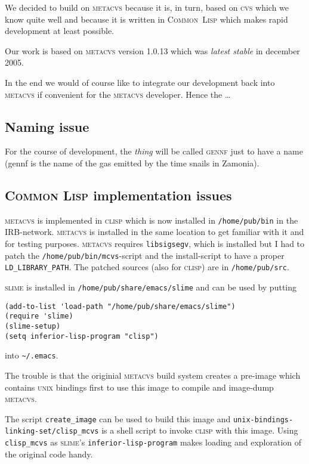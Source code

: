 \documentclass[fleqn, 10pt, a4paper]{article}
\begin{document}
We decided to build on \textsc{metacvs} because it is, in turn, based on
\textsc{cvs} which we know quite well and because it is written in
\textsc{Common~Lisp} which makes rapid development at least possible.

Our work is based on \textsc{metacvs} version 1.0.13 which was
\emph{latest stable} in december 2005.

In the end we would of course like to integrate our development back
into \textsc{metacvs} if convenient for the \textsc{metacvs} developer.
Hence the \ldots

\subsection{Naming issue}
For the course of development, the \emph{thing} will be called
\textsc{gennf} just to have a name (gennf is the name of the gas emitted
by the time snails in Zamonia).

\subsection{\textsc{Common Lisp} implementation issues}
\textsc{metacvs} is implemented in \textsc{clisp} which is now installed
in \texttt{/home/pub/bin} in the IRB-network. \textsc{metacvs} is
installed in the same location to get familiar with it and for testing
purposes. \textsc{metacvs} requires \texttt{libsigsegv}, which is
installed but I had to patch the \texttt{/home/pub/bin/mcvs}-script and
the install-script to have a proper \texttt{LD\_LIBRARY\_PATH}. The
patched sources (also for \textsc{clisp}) are in \texttt{/home/pub/src}.

\textsc{slime} is installed in \texttt{/home/pub/share/emacs/slime} and
can be used by putting
\begin{verbatim}
(add-to-list 'load-path "/home/pub/share/emacs/slime")
(require 'slime)
(slime-setup)
(setq inferior-lisp-program "clisp")
\end{verbatim}

into \texttt{\textasciitilde/.emacs}.

The trouble is that the originial \textsc{metacvs} build system
creates a pre-image which contains \textsc{unix} bindings first to use
this image to compile and image-dump \textsc{metacvs}.

The script \texttt{create\_image} can be used to build this image
and \texttt{unix-bindings-linking-set/clisp\_mcvs} is a shell script
to invoke \textsc{clisp} with this image. Using \texttt{clisp\_mcvs}
as \textsc{slime}'s \texttt{inferior-lisp-program} makes loading
and exploration of the original code handy.
\end{document}
